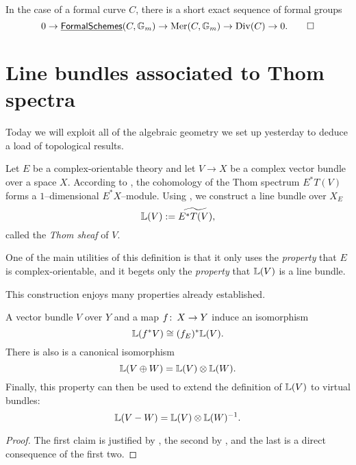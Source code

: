 \begin{theorem}
In the case of a formal curve $C$, there is a short exact sequence of formal groups \[0 \to \operatorname{\underline{\smash{\mathsf{FormalSchemes}}}}(C, \mathbb G_m) \to \operatorname{Mer}(C, \mathbb G_m) \to \operatorname{Div}(C) \to 0. \qed\]
\end{theorem}











\section{Line bundles associated to Thom spectra}\label{ProjectivizationLecture}

Today we will exploit all of the algebraic geometry we set up yesterday to deduce a load of topological results.

\begin{definition}\label{DefnThomSheaf}
Let $E$ be a complex-orientable theory and let $V \to X$ be a complex vector bundle over a space $X$.  According to , the cohomology of the Thom spectrum $E^* T(V)$ forms a $1$--dimensional $E^* X$--module.  Using , we construct a line bundle over $X_E$ \[\mathbb{L}(V) := \widetilde{E^* T(V)},\] called the \textit{Thom sheaf} of $V$.
\end{definition}

\begin{remark}
One of the main utilities of this definition is that it only uses the \emph{property} that $E$ is complex-orientable, and it begets only the \emph{property} that $\mathbb{L}(V)$ is a line bundle.
\end{remark}

This construction enjoys many properties already established.
\begin{corollary}\label{PropertiesOfThomSheaves}
A vector bundle $V$ over $Y$ and a map $f \colon\thinspace X \to Y$ induce an isomorphism \[\mathbb{L}(f^* V) \cong (f_E)^* \mathbb{L}(V).\]  There is also is a canonical isomorphism \[\mathbb{L}(V \oplus W) = \mathbb{L}(V) \otimes \mathbb{L}(W).\]  Finally, this property can then be used to extend the definition of $\mathbb{L}(V)$ to virtual bundles: \[\mathbb{L}(V - W) = \mathbb{L}(V) \otimes \mathbb{L}(W)^{-1}.\]
\end{corollary}
\begin{proof}
The first claim is justified by , the second by , and the last is a direct consequence of the first two.
\end{proof}


